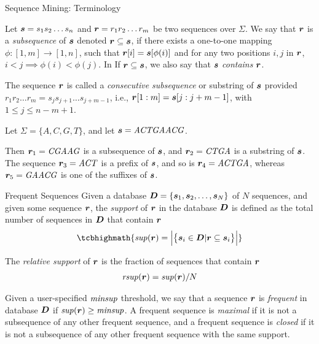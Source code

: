 \begin{frame}{Sequence Mining: Terminology}

  Let ${\boldsymbol s} = s_1s_2 \ldots s_{n}$ and ${\boldsymbol r} = r_1r_2 \ldots r_{m}$ be two
sequences over $\Sigma$.  We say that ${\boldsymbol r}$ is a {\em subsequence} of
${\boldsymbol s}$ denoted ${\boldsymbol r} \subseteq {\boldsymbol s}$, if there exists a one-to-one mapping
$\phi: [1,m] \to [1,n]$, such that ${\boldsymbol r}[i] = {\boldsymbol s}[\phi(i)]$ and for any
two positions $i,j$ in ${\boldsymbol r}$, $i < j \implies \phi(i) < \phi(j)$. In
If ${\boldsymbol r} \subseteq {\boldsymbol s}$, we also say that ${\boldsymbol s}$ {\em contains} ${\boldsymbol r}$.

\medskip
The sequence ${\boldsymbol r}$ is called a {\em consecutive subsequence} or
substring of ${\boldsymbol s}$ provided $r_1r_2\ldots r_{m} = s_{j}s_{j+1}\ldots
s_{j+m-1}$, i.e., ${\boldsymbol r}[1:m] ={\boldsymbol s}[j:j+m-1]$, with $1\le j \le n-m+1$.

\begin{block}

Let $\Sigma = \{A,C,G,T\}$, and let ${\boldsymbol s} = \mathit{ACTGAACG}$.  

Then
${\boldsymbol r}_1=\mathit{CGAAG}$ is a subsequence of ${\boldsymbol s}$, and ${\boldsymbol r}_2=\mathit{CTGA}$ is a substring
of ${\boldsymbol s}$.  The sequence ${\boldsymbol r}_3=\mathit{ACT}$ is a pref\/{i}x of ${\boldsymbol s}$, and so is
${\boldsymbol r}_4=\mathit{ACTGA}$, whereas ${\boldsymbol r}_5=\mathit{GAACG}$ is one of the suff\/{i}xes of ${\boldsymbol s}$.
\end{block}%
\end{frame}
%

\begin{frame}{Frequent Sequences}
Given a database ${\boldsymbol D} = \{{\boldsymbol s}_1,{\boldsymbol s}_2, \ldots, {\boldsymbol s}_N\}$ of $N$
sequences, and given some sequence ${\boldsymbol r}$, the {\em support} of ${\boldsymbol r}$ in
the database ${\boldsymbol D}$ is def\/{i}ned as the total number of sequences in ${\boldsymbol D}$
that contain ${\boldsymbol r}$
\begin{align*}
\tcbhighmath{
  \supp(\br) = \bcard{\Big}{\bigl\{\bs_i \in \bD | \br \subseteq
  \bs_i\bigr\}}
}
\end{align*}

\medskip
The {\em relative support} of ${\boldsymbol r}$ is the fraction of sequences that
contain ${\boldsymbol r}$
\begin{align*}
  \mathit{rsup}({\boldsymbol r}) = \mathit{sup}({\boldsymbol r})/N
\end{align*}

\medskip
Given a user-specif\/{i}ed $\mathit{minsup}$ threshold, we say that a sequence ${\boldsymbol r}$
is {\em frequent} in database ${\boldsymbol D}$ if $\mathit{sup}({\boldsymbol r}) \ge \mathit{minsup}$.  A
frequent sequence is {\em maximal} if it is not a subsequence of any
other frequent sequence, and a frequent sequence is {\em closed} if it
is not a subsequence of any other frequent sequence with the same
support.

\end{frame}


